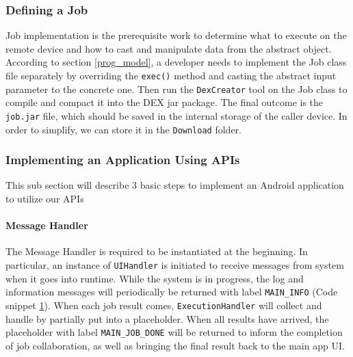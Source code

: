 \documentclass{sig-alternate}[10pt]
\begin{document}
\subsubsection{Defining a Job}

Job implementation is the prerequisite work to determine what to execute on the remote device and how to cast and manipulate data from the abstract object. According to section \ref{prog_model}, a developer needs to implement the Job class file separately by overriding the \texttt{exec()} method and casting the abstract input parameter to the concrete one. Then run the \texttt{DexCreator} tool on the Job class to compile and compact it into the DEX jar package. The final outcome is the \texttt{job.jar} file, which should be saved in the internal storage of the caller device. In order to simplify, we can store it in the \texttt{Download} folder.  

\subsubsection{Implementing an Application Using APIs}

This sub section will describe 3 basic steps to implement an Android application to utilize our APIs

\paragraph{Message Handler}

The Message Handler is required to be instantiated at the beginning. In particular, an instance of \texttt{UIHandler} is initiated to receive messages from system when it goes into runtime. While the system is in progress, the log and information messages will periodically be returned with label \texttt{MAIN\_INFO} (Code snippet \ref{ui_handler}). When each job result comes, \texttt{ExecutionHandler} will collect and handle by partially put into a placeholder. When all results have arrived, the placeholder with label \texttt{MAIN\_JOB\_DONE} will be returned to inform the completion of job collaboration, as well as bringing the final result back to the main app UI.

\begin{figure}
\noindent {}
\label{ui_handler}
\end{figure}
\end{document}
